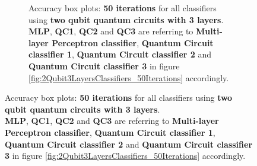 \begin{figure}[!h]
\begin{subfigure}{1.0\textwidth}
\begin{subfigure}{1.0\textwidth}
{            }
        \end{subfigure}
        \begin{subfigure}{1.0\textwidth}
            \centering
        \end{subfigure}
        \begin{subfigure}{1.0\textwidth}
            \centering
        \end{subfigure}
        \caption{Accuracy box plots: \textbf{50 iterations} for all classifiers using \textbf{two qubit quantum circuits with 3 layers}.\\ \textbf{MLP}, \textbf{QC1}, \textbf{QC2} and \textbf{QC3} are referring to \textbf{Multi-layer Perceptron classifier}, \textbf{Quantum Circuit classifier 1}, \textbf{Quantum Circuit classifier 2} and \textbf{Quantum Circuit classifier 3} in figure \ref{fig:2Qubit3LayersClassifiers_50Iterations} accordingly.}
        \label{fig:2Qubit3LayersClassifiers_50Iterations_boxplot}
    \end{subfigure}
\end{figure}

